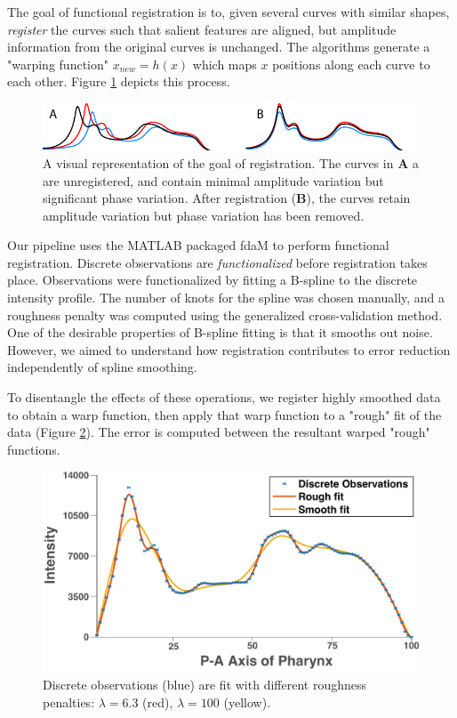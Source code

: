 The goal of functional registration is to, given several curves with similar shapes, \textit{register} the curves such that salient features are aligned, but amplitude information from the original curves is unchanged. The algorithms generate a "warping function" $x_{new} = h(x)$ which maps $x$ positions along each curve to each other. Figure \ref{fig:FunctionalRegistrationCartoon} depicts this process. 

\begin{figure}[ht]
    \centering
    \includegraphics{Figures/rendered_files/functional_registration}
    \decoRule
    \caption[Functional registration of intensity profiles]{A visual representation of the goal of registration. The curves in \textbf{A} a are unregistered, and contain minimal amplitude variation but significant phase variation. After registration (\textbf{B}), the curves retain amplitude variation but phase variation has been removed.}
    \label{fig:FunctionalRegistrationCartoon}
\end{figure}

Our pipeline uses the MATLAB packaged fdaM  to perform functional registration. Discrete observations are \textit{functionalized} before registration takes place. Observations were functionalized by fitting a B-spline to the discrete intensity profile. The number of knots for the spline was chosen manually, and a roughness penalty was computed using the generalized cross-validation method. One of the desirable properties of B-spline fitting is that it smooths out noise. However, we aimed to understand how registration contributes to error reduction independently of spline smoothing. 

To disentangle the effects of these operations, we register highly smoothed data to obtain a warp function, then apply that warp function to a "rough" fit of the data (Figure \ref{fig:SmoothRough}). The error is computed between the resultant warped "rough" functions.

\begin{figure}[ht]
    \centering
    \includegraphics[scale=0.6]{Figures/rendered_files/smoothRough}
    \decoRule
    \caption[Smooth vs. rough functionalization]{Discrete observations (blue) are fit with different roughness penalties: $\lambda=6.3$ (red), $\lambda=100$ (yellow).}
    \label{fig:SmoothRough}
\end{figure}
